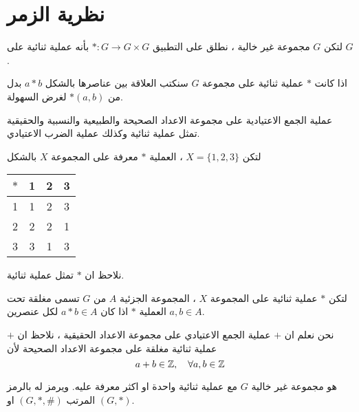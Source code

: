 \chapter{نظرية الزمر}

\begin{definition}
	لتكن $G$ مجموعة غير خالية ، نطلق على التطبيق $*:G\to G\times G$ بأنه عملية ثنائية على $G$.
\end{definition}

\begin{note}
	اذا كانت $*$ عملية ثنائية على مجموعة $G$ سنكتب العلاقة بين عناصرها بالشكل $a*b$ بدل من $*(a, b)$ لغرض السهولة.
\end{note}

\begin{example}
عملية الجمع الاعتيادية على مجموعة الاعداد الصحيحة والطبيعية والنسبية والحقيقية تمثل عملية ثنائية وكذلك عملية الضرب الاعتيادي. 
\end{example}

\begin{example}
	لتكن $X = \{1,2,3\}$ ، العملية $*$ معرفة على المجموعة $X$ بالشكل
	\begin{table}[H]
		\renewcommand{\arraystretch}{1.4}
		\centering
		\setLR
		\begin{tabular}{|c|c|c|c|}
			\hline
			$*$ & 1&2&3\\
			\hline
			1&1&2&3\\
			\hline
			2&2&2&1\\
			\hline
			3&3&1&3\\
			\hline
		\end{tabular}
	\end{table}
	\setRL\noindent
	نلاحظ ان $*$ تمثل عملية ثنائية.
\end{example}

\begin{definition}[( الانغلاق )]
	لتكن $*$ عملية ثنائية على المجموعة $X$ ، المجموعة الجزئية $A$ من $G$ تسمى مغلقة تحت العملية $*$ اذا كان $a*b \in A$ لكل عنصرين $a, b\in A$.
\end{definition}

\begin{example}
	نحن نعلم ان $+$ عملية الجمع الاعتيادي على مجموعة الاعداد الحقيقية ، نلاحظ ان $+$ عملية ثنائية مغلقة على مجموعة الاعداد الصحيحة لأن
	\[
	a+b \in \mathbb{Z} ,\quad \forall a, b\in \mathbb{Z}
	\]
\end{example}

\begin{definition}
	هو مجموعة غير خالية $G$ مع عملية ثنائية واحدة او اكثر معرفة عليه. ويرمز له بالرمز المرتب $(G, *, \#)$ او $(G, *)$.
\end{definition}

